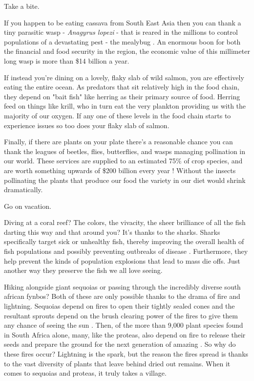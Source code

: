 \documentclass[11pt,a5paper]{book}
\begin{document}
Take a bite. 
\newline 

If you happen to be eating cassava from South East Asia then you can thank a tiny parasitic wasp - \textit{Anagyrus lopezi} - that is reared in the millions to control populations of a devastating pest - the mealybug \cite{wpark}. An enormous boon for both the financial and food security in the region, the economic value of this millimeter long wasp is more than \$14 billion a year. 
\newline

If instead you're dining on a lovely, flaky slab of wild salmon, you are effectively eating the entire ocean. As predators that sit relatively high in the food chain, they depend on "bait fish" like herring as their primary source of food. Herring feed on things like krill, who in turn eat the very plankton providing us with the majority of our oxygen. If any one of these levels in the food chain starts to experience issues so too does your flaky slab of salmon. 
\newline

Finally, if there are plants on your plate there's a reasonable chance you can thank the leagues of beetles, flies, butterflies, and wasps managing pollination in our world. These services are supplied to an estimated 75\% of crop species, and are worth something upwards of \$200 billion every year \cite{avanbergen}! Without the insects pollinating the plants that produce our food the variety in our diet would shrink dramatically.
\newline

Go on vacation. 
\newline

Diving at a coral reef? The colors, the vivacity, the sheer brilliance of all the fish darting this way and that around you? It's thanks to the sharks. Sharks specifically target sick or unhealthy fish, thereby improving the overall health of fish populations and possibly preventing outbreaks of disease \cite{reefcause}. Furthermore, they help prevent the kinds of population explosions that lead to mass die offs. Just another way they preserve the fish we all love seeing. 
\newline

Hiking alongside giant sequoias or passing through the incredibly diverse south african fynbos? Both of these are only possible thanks to the drama of fire and lightning. Sequoias depend on fires to open their tightly sealed cones and the resultant sprouts depend on the brush clearing power of the fires to give them any chance of seeing the sun \cite{california}. Then, of the more than 9,000 plant species found in South Africa alone, many, like the proteas, also depend on fire to release their seeds and prepare the ground for the next generation of amazing \cite{shoek}. So why do these fires occur? Lightning is the spark, but the reason the fires spread is thanks to the vast diversity of plants that leave behind dried out remains. When it comes to sequoias and proteas, it truly takes a village. 
\newline
\end{document}
